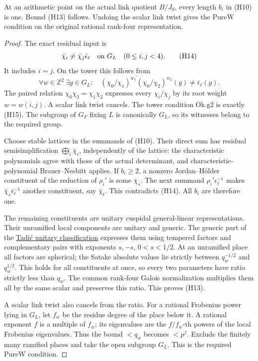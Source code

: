 \begin{srlemma}\label{lem:sr-case-two-speh-exclusion}
At an arithmetic point on the actual link quotient
\(B/J_0\), every length \(b_i\) in (H10) is one.
Bound (H13) follows.
Undoing the scalar link twist gives the
\(\mathrm{PureW}\) condition on the original rational
rank-four representation.
\end{srlemma}
\begin{proof}
The exact residual input is
\[
          \bar\chi_i\ne\bar\chi_j\bar\epsilon_\ell
                       \quad\hbox{on }G_L\quad(0\le i,j<4).
 \tag{H14}
\]
It includes \(i=j\).
On the tower this follows from
\[
 \forall w\in\mathbb Z^2\ \exists g\in G_L:\quad
       \overline{(\chi_0/\chi_1)^{w_1}
                 (\chi_0/\chi_2)^{w_2}}(g)
                              \ne\bar\epsilon_\ell(g).
 \tag{H15}
\]
The paired relation \(\chi_0\chi_3=\chi_1\chi_2\)
expresses every \(\chi_i/\chi_j\) by its root weight
\(w=w(i,j)\). A scalar link twist cancels.
The tower condition \(\mathrm{Ok.g2}\) is exactly
(H15). The subgroup of \(G_F\) fixing \(L\) is
canonically \(G_L\), so its witnesses belong to the
required group.

Choose stable lattices in the summands of (H10).
Their direct sum has residual semisimplification
\(\bigoplus_i\bar\chi_i\), independently of the lattice:
the characteristic polynomials agree with those of
the actual determinant, and characteristic-polynomial
Brauer--Nesbitt applies.
If \(b_i\ge2\), a nonzero Jordan--H\"older
constituent of the reduction of \(\rho_i'\) is
some \(\bar\chi_s\).
The next summand
\(\rho_i'\epsilon_\ell^{-1}\) makes
\(\bar\chi_s\bar\epsilon_\ell^{-1}\) another constituent,
say \(\bar\chi_t\).
This contradicts (H14). All \(b_i\) are therefore one.

The remaining constituents are unitary cuspidal
general-linear representations. Their unramified
local components are unitary and generic.
The generic part of the
\href{https://www.numdam.org/item/ASENS_1986_4_19_3_335_0/}
{Tadi\'c unitary classification} expresses them using
tempered factors and complementary pairs with
exponents \(s,-s\), \(0<s<1/2\).
At an unramified place all factors are spherical;
the Satake absolute values lie strictly between
\(q_w^{-1/2}\) and \(q_w^{1/2}\).
This holds for all constituents at once, so every
two parameters have ratio strictly less than \(q_w\).
The common rank-four Galois normalization multiplies
them all by the same scalar and preserves this ratio.
This proves (H13).

A scalar link twist also cancels from the ratio.
For a rational Frobenius power lying in \(G_L\),
let \(f_w\) be the residue degree of the place below it.
A rational exponent \(f\) is a multiple of \(f_w\);
its eigenvalues are the \(f/f_w\)-th powers of
the local Frobenius eigenvalues.
Thus the bound \(<q_w\) becomes \(<p^f\).
Exclude the finitely many ramified places and take the
open subgroup \(G_L\). This is the required
\(\mathrm{PureW}\) condition.
\end{proof}

